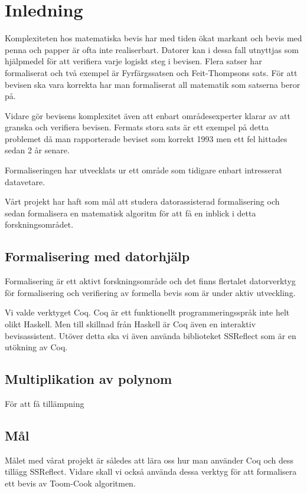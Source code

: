 \section{Inledning}
Komplexiteten hos matematiska bevis har med tiden ökat markant och bevis med
penna och papper är ofta inte realiserbart. Datorer kan i dessa fall utnyttjas
som hjälpmedel för att verifiera varje logiskt steg i bevisen. Flera satser har
formaliserat och två exempel är Fyrfärgssatsen\cite{gonthier2008formal} och
Feit-Thompsons sats\cite{something}. För att bevisen ska vara korrekta har man
formaliserat all matematik som satserna beror på.

Vidare gör bevisens komplexitet även att enbart områdesexperter klarar av att
granska och verifiera bevisen. Fermats stora sats är ett exempel på detta
problemet då man rapporterade beviset som korrekt 1993 men ett fel hittades
sedan 2 år senare\cite{something}.

Formaliseringen har utvecklats ur ett område som tidigare enbart intresserat
datavetare.

Vårt projekt har haft som mål att studera datorassisterad formalisering och
sedan formalisera en matematisk algoritm för att få en inblick i detta
forskningsområdet.

\subsection{Formalisering med datorhjälp}
Formalisering är ett aktivt forskningsområde och det finns flertalet
datorverktyg för formalisering och verifiering av formella bevis som är under
aktiv utveckling.

Vi valde verktyget Coq. Coq är ett funktionellt programmeringsspråk inte helt
olikt Haskell. Men till skillnad från Haskell är Coq även en interaktiv
bevisassistent. Utöver detta ska vi även använda biblioteket SSReflect som är
en utökning av Coq.

\subsection{Multiplikation av polynom}
För att få tillämpning

\subsection{Mål}
Målet med vårat projekt är således att lära oss hur man använder Coq och dess
tillägg SSReflect. Vidare skall vi också använda dessa verktyg för att
formalisera ett bevis av Toom-Cook algoritmen.
